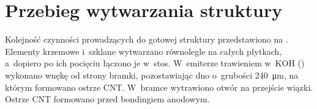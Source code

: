 \section{Przebieg wytwarzania struktury}
\label{sec:przebieg}

Kolejność czynności prowadzących do gotowej struktury przedstawiono na
. Elementy krzemowe i~szklane wytwarzano równolegle
na całych płytkach, a~dopiero po ich pocięciu łączono je w~stos.
W~emiterze trawieniem w~KOH () wykonano wnękę od strony
bramki, pozostawiając dno o~grubości \SI{240}{\micro\metre}, na którym
formowano ostrze CNT. W~bramce wytrawiono otwór na przejście wiązki. Ostrze CNT formowano przed bondingiem
anodowym.


